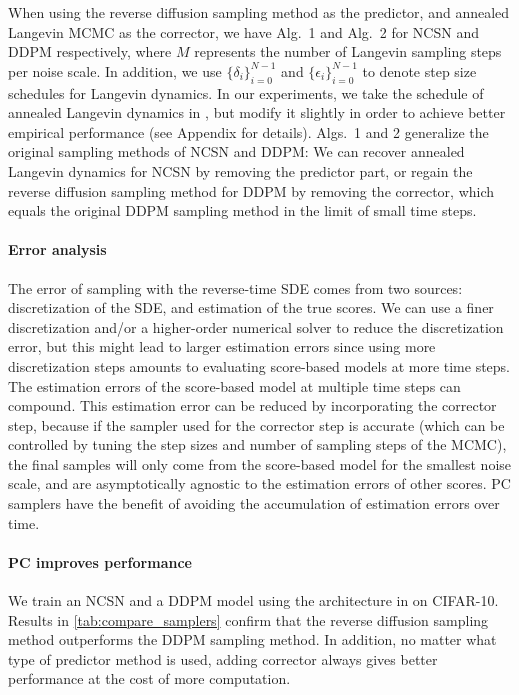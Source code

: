 When using the reverse diffusion sampling method as the predictor, and annealed Langevin MCMC as the corrector, we have Alg.~1 and Alg.~2 for NCSN and DDPM respectively, where $M$ represents the number of Langevin sampling steps per noise scale. In addition, we use $\{\delta_i\}_{i=0}^{N-1}$ and $\{\epsilon_i\}_{i=0}^{N-1}$ to denote step size schedules for Langevin dynamics. In our experiments, we take the schedule of annealed Langevin dynamics in \citet{song2019generative}, but modify it slightly in order to achieve better empirical performance (see Appendix for details). Algs.~1 and 2 generalize the original sampling methods of NCSN and DDPM: We can recover annealed Langevin dynamics for NCSN by removing the predictor part, or regain the reverse diffusion sampling method for DDPM by removing the corrector, which equals the original DDPM sampling method in the limit of small time steps.

\paragraph{Error analysis} The error of sampling with the reverse-time SDE comes from two sources: discretization of the SDE, and estimation of the true scores. We can use a finer discretization and/or a higher-order numerical solver to reduce the discretization error, but this might lead to larger estimation errors since using more discretization steps amounts to evaluating score-based models at more time steps. The estimation errors of the score-based model at multiple time steps can compound. This estimation error can be reduced by incorporating the corrector step, because if the sampler used for the corrector step is accurate (which can be controlled by tuning the step sizes and number of sampling steps of the MCMC), the final samples will only come from the score-based model for the smallest noise scale, and are asymptotically agnostic to the estimation errors of other scores. PC samplers have the benefit of avoiding the accumulation of estimation errors over time.

\paragraph{PC improves performance} We train an NCSN and a DDPM model using the architecture in \cite{ho2020denoising} on CIFAR-10. Results in \cref{tab:compare_samplers} confirm that the reverse diffusion sampling method outperforms the DDPM sampling method. In addition, no matter what type of predictor method is used, adding corrector always gives better performance at the cost of more computation. 


